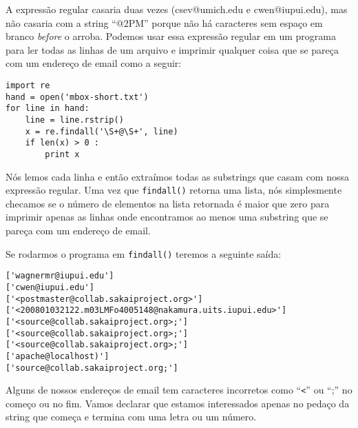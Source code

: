 A expressão regular casaria duas vezes (csev@umich.edu e cwen@iupui.edu), mas não casaria com a
string ``@2PM'' porque não há caracteres sem espaço em branco {\em before} o arroba.
Podemos usar essa expressão regular em um programa para ler todas as linhas de um arquivo e 
imprimir qualquer coisa que se pareça com um endereço de email como a seguir: 

\beforeverb
\begin{verbatim}
import re
hand = open('mbox-short.txt')
for line in hand:
    line = line.rstrip()
    x = re.findall('\S+@\S+', line)
    if len(x) > 0 :
        print x
\end{verbatim}
\afterverb
%

Nós lemos cada linha e então extraímos todas as substrings que casam com nossa expressão regular.
Uma vez que {\tt findall()} retorna uma lista, nós simplesmente checamos se o número de elementos
na lista retornada é maior que zero para imprimir apenas as linhas onde encontramos ao menos uma 
substring que se pareça com um endereço de email.

Se rodarmos o programa em {\tt findall()} teremos a seguinte saída:

\beforeverb
\begin{verbatim}
['wagnermr@iupui.edu']
['cwen@iupui.edu']
['<postmaster@collab.sakaiproject.org>']
['<200801032122.m03LMFo4005148@nakamura.uits.iupui.edu>']
['<source@collab.sakaiproject.org>;']
['<source@collab.sakaiproject.org>;']
['<source@collab.sakaiproject.org>;']
['apache@localhost)']
['source@collab.sakaiproject.org;']
\end{verbatim}
\afterverb
%

Alguns de nossos endereços de email tem caracteres incorretos como ``\verb"<"'' ou ``;'' no 
começo ou no fim. Vamos declarar que estamos interessados apenas no pedaço da string que começa e
termina com uma letra ou um número.  

